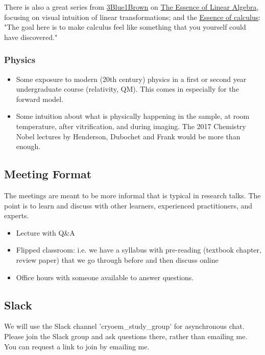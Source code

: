 \documentclass[11pt, oneside]{article}   	%
\begin{document}
There is also a great series from \href{https://www.youtube.com/c/3blue1brown}{3Blue1Brown} on \href{https://youtube.com/playlist?list=PLZHQObOWTQDPD3MizzM2xVFitgF8hE_ab}{The Essence of Linear Algebra}, focusing on visual intuition of  linear transformations; and the \href{https://youtube.com/playlist?list=PLZHQObOWTQDMsr9K-rj53DwVRMYO3t5Yr}{Essence of calculus}: "The goal here is to make calculus feel like something that you yourself could have discovered."

\subsubsection{Physics}
\begin{itemize}
	\item Some exposure to modern (20th century) physics in a first or second year undergraduate course (relativity, QM). This comes in especially for the forward model.
	\item Some intuition about what is physically happening in the sample, at room temperature, after vitrification, and during imaging. The 2017 Chemistry Nobel lectures by Henderson, Dubochet and Frank would be more than enough.
\end{itemize}

\subsection{Meeting Format}
The meetings are meant to be more informal that is typical in research talks. The point is to learn and discuss with other learners, experienced practitioners, and experts.
\begin{itemize}
	\item Lecture with Q\&A
	\item Flipped classroom: i.e. we have a syllabus with pre-reading (textbook chapter, review paper) that we go through before and then discuss online
	\item Office hours with someone available to answer questions.
\end{itemize}

\subsection{Slack}
We will use the Slack channel 'cryoem\_study\_group' for asynchronous chat. Please join the Slack group and ask questions there, rather than emailing me. You can request a link to join by emailing me.
\end{document}
